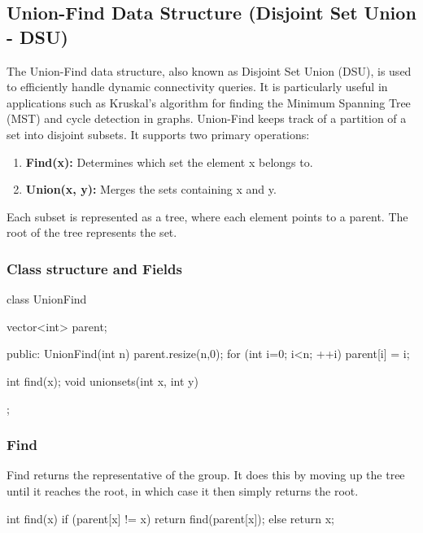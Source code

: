 \documentclass{report}
\begin{document}
\pagebreak \bigbreak \noindent 
\subsection{Union-Find Data Structure (Disjoint Set Union - DSU)}
\bigbreak \noindent 
The Union-Find data structure, also known as Disjoint Set Union (DSU), is used to efficiently handle dynamic connectivity queries. It is particularly useful in applications such as Kruskal's algorithm for finding the Minimum Spanning Tree (MST) and cycle detection in graphs.
\bigbreak \noindent 
Union-Find keeps track of a partition of a set into disjoint subsets. It supports two primary operations:
\begin{enumerate}
    \item \textbf{Find(x):} Determines which set the element x belongs to.
    \item \textbf{Union(x, y):} Merges the sets containing x and y.
\end{enumerate}
\bigbreak \noindent 
Each subset is represented as a tree, where each element points to a parent. The root of the tree represents the set.

\bigbreak \noindent 
\subsubsection{Class structure and Fields}
\bigbreak \noindent 
\begin{cppcode}
    class UnionFind {
        vector<int> parent;

    public:
        UnionFind(int n) {
            parent.resize(n,0);
            for (int i=0; i<n; ++i) {
                parent[i] = i;
            }
        }

        int find(x);
        void unionsets(int x, int y)
    };
\end{cppcode}

\bigbreak \noindent 
\subsubsection{Find}
\bigbreak \noindent 
Find returns the representative of the group. It does this by moving up the tree until it reaches the root, in which case it then simply returns the root.
\bigbreak \noindent 
\begin{cppcode}
    int find(x) {
        if (parent[x] != x) {
            return find(parent[x]);
        } else {
            return x;
        }
    }
\end{cppcode}
\end{document}

